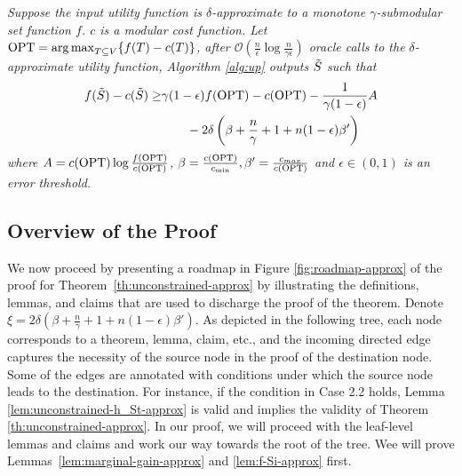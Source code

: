 \documentclass[10pt]{article} %
\DeclareMathOperator*{\argmax}{arg\,max}
\newtheorem{theorem}{Theorem}
\theoremstyle{remark}
\newcommand{\OPT}{{\rm OPT}}
\newenvironment{manualtheorem}[1]{%
  \renewcommand\themanualtheoreminner{#1}%
  \manualtheoreminner
}{\endmanualtheoreminner}
\begin{document}
\begin{manualtheorem}{\textbf{3.10}}
\textit{Suppose the input utility function is $\delta$-approximate to a monotone $\gamma$-submodular set function $f$. $c$ is a modular cost function. Let $\OPT =  \argmax_{T \subseteq V}\{f(T)-c(T)\}$, after $\mathcal{O}(\frac{n}{\epsilon}\log \frac{n}{\gamma \epsilon})$ oracle calls to the $\delta$-approximate utility function,  Algorithm \ref{alg:up} outputs $\Tilde{S}$ such that}
    \begin{align*}
        f(\Tilde{S})-c(\Tilde{S}) \geq  &\gamma(1-\epsilon)f(\OPT)-c(\OPT)-\frac{1}{\gamma (1-\epsilon)}A \\
        &\quad\quad- 2\delta\left(\beta+ \frac{n}{\gamma} + 1 + n(1-\epsilon)\beta'\right)
    \end{align*}
    \textit{where $A = c(\OPT) \log \frac{f(\OPT)}{c(\OPT)}$, $\beta = \frac{c(\OPT)}{c_{\min}}, \beta' = \frac{c_{max}}{c(\OPT)}$ and  $\epsilon \in (0,1)$ is an error threshold.}
\end{manualtheorem}


%

\subsection{Overview of the Proof}
We now proceed by presenting a roadmap in Figure \ref{fig:roadmap-approx} of the proof for Theorem~\ref{th:unconstrained-approx} by illustrating the definitions, lemmas, and claims that are used to discharge the proof of the theorem. Denote $\xi=2\delta\left(\beta+ \frac{n}{\gamma} + 1 + n(1-\epsilon)\beta'\right)$. As depicted in the following tree, each node corresponds to a
theorem, lemma, claim, etc., and the incoming directed edge captures the necessity of the source node in
the proof of the destination node. Some of the edges are annotated with conditions under which the
source node leads to the destination. For instance, if the condition in Case 2.2
holds, Lemma \ref{lem:unconstrained-h_St-approx} is valid and implies the validity of Theorem \ref{th:unconstrained-approx}.  
In our proof, we will proceed with the leaf-level lemmas and claims and work our way towards the root of the tree. 
Wee will prove Lemmas~\ref{lem:marginal-gain-approx} and \ref{lem:f-Si-approx} first. 
\end{document}
